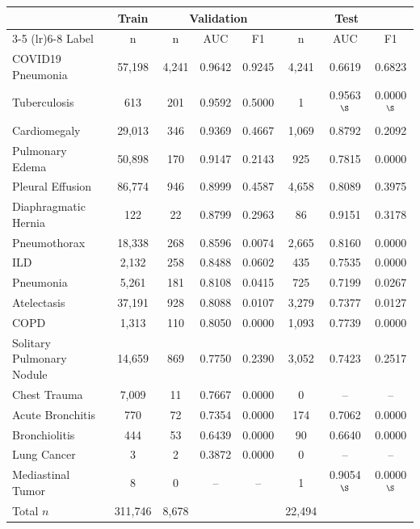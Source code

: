 \documentclass[a4paper,11pt]{article}
\begin{document}
\begin{center}
\label{tab:per-label-flat-mc}

\footnotesize
\renewcommand{\arraystretch}{1.4}
\setlength{\tabcolsep}{4pt}
\begin{tabular}{l c ccc ccc}
\toprule
 & Train & \multicolumn{3}{c}{Validation} & \multicolumn{3}{c}{Test} \\
\cmidrule(lr){3-5} \cmidrule(lr){6-8}
Label & n & n & AUC & F1 & n & AUC & F1 \\
\midrule
COVID19 Pneumonia         & 57,198 & 4,241 & 0.9642 & 0.9245 & 4,241 & 0.6619          & 0.6823 \\
Tuberculosis              & 613    & 201   & 0.9592 & 0.5000 & 1     & 0.9563$^\S$      & 0.0000$^\S$ \\
Cardiomegaly              & 29,013 & 346   & 0.9369 & 0.4667 & 1,069 & 0.8792          & 0.2092 \\
Pulmonary Edema           & 50,898 & 170   & 0.9147 & 0.2143 & 925   & 0.7815          & 0.0000 \\
Pleural Effusion          & 86,774 & 946   & 0.8999 & 0.4587 & 4,658 & 0.8089          & 0.3975 \\
Diaphragmatic Hernia      & 122    & 22    & 0.8799 & 0.2963 & 86    & 0.9151          & 0.3178 \\
Pneumothorax              & 18,338 & 268   & 0.8596 & 0.0074 & 2,665 & 0.8160          & 0.0000 \\
ILD                       & 2,132  & 258   & 0.8488 & 0.0602 & 435   & 0.7535          & 0.0000 \\
Pneumonia                 & 5,261  & 181   & 0.8108 & 0.0415 & 725   & 0.7199          & 0.0267 \\
Atelectasis               & 37,191 & 928   & 0.8088 & 0.0107 & 3,279 & 0.7377          & 0.0127 \\
COPD                      & 1,313  & 110   & 0.8050 & 0.0000 & 1,093 & 0.7739          & 0.0000 \\
Solitary Pulmonary Nodule & 14,659 & 869   & 0.7750 & 0.2390 & 3,052 & 0.7423          & 0.2517 \\
Chest Trauma              & 7,009  & 11    & 0.7667 & 0.0000 & 0     & --              & -- \\
Acute Bronchitis          & 770    & 72    & 0.7354 & 0.0000 & 174   & 0.7062          & 0.0000 \\
Bronchiolitis             & 444    & 53    & 0.6439 & 0.0000 & 90    & 0.6640          & 0.0000 \\
Lung Cancer               & 3      & 2     & 0.3872 & 0.0000 & 0     & --              & -- \\
Mediastinal Tumor         & 8      & 0     & --     & --     & 1     & 0.9054$^\S$      & 0.0000$^\S$ \\
\midrule
Total $n$                 & 311,746 & 8,678 &       &        & 22,494 &                &        \\
\bottomrule
\end{tabular}
\end{center}
\end{document}
